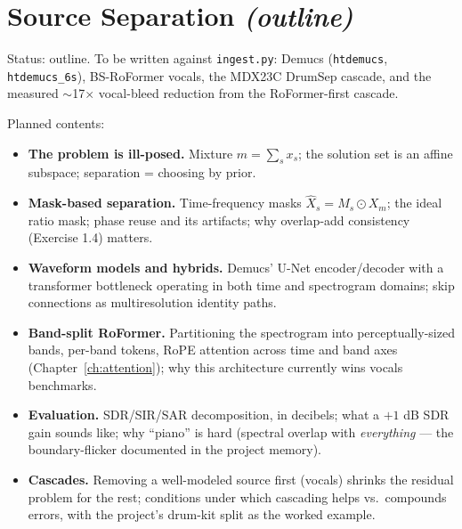 \chapter{Source Separation \emph{(outline)}}\label{ch:separation}

\begin{incode}
Status: outline. To be written against \texttt{ingest.py}: Demucs
(\texttt{htdemucs}, \texttt{htdemucs\_6s}), BS-RoFormer vocals, the MDX23C
DrumSep cascade, and the measured $\sim$17$\times$ vocal-bleed reduction from
the RoFormer-first cascade.
\end{incode}

Planned contents:
\begin{itemize}
  \item \textbf{The problem is ill-posed.} Mixture $m = \sum_s x_s$; the
  solution set is an affine subspace; separation = choosing by prior.
  \item \textbf{Mask-based separation.} Time-frequency masks
  $\hat{X}_s = M_s \odot X_m$; the ideal ratio mask; phase reuse and its
  artifacts; why overlap-add consistency (Exercise 1.4) matters.
  \item \textbf{Waveform models and hybrids.} Demucs' U-Net encoder/decoder
  with a transformer bottleneck operating in both time and spectrogram
  domains; skip connections as multiresolution identity paths.
  \item \textbf{Band-split RoFormer.} Partitioning the spectrogram into
  perceptually-sized bands, per-band tokens, RoPE attention across time and
  band axes (Chapter~\ref{ch:attention}); why this architecture currently
  wins vocals benchmarks.
  \item \textbf{Evaluation.} SDR/SIR/SAR decomposition, in decibels; what a
  $+1$ dB SDR gain sounds like; why ``piano'' is hard (spectral overlap with
  \emph{everything} --- the boundary-flicker documented in the project
  memory).
  \item \textbf{Cascades.} Removing a well-modeled source first
  (vocals) shrinks the residual problem for the rest; conditions under which
  cascading helps vs.\ compounds errors, with the project's drum-kit split
  as the worked example.
\end{itemize}
